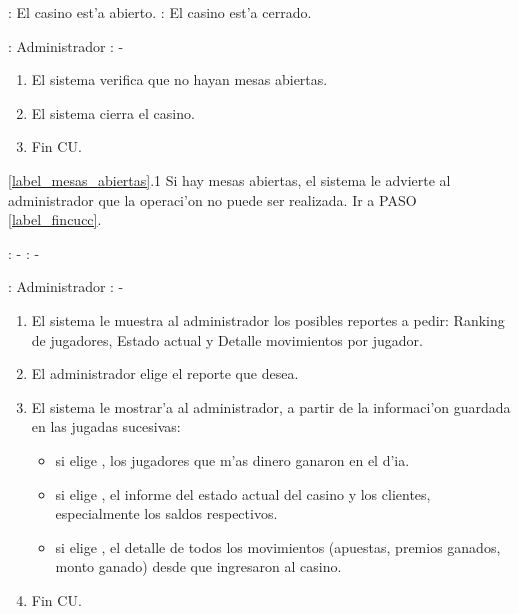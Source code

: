 : El casino est'a abierto. \newline
\indent{}: El casino est'a cerrado.

: Administrador \newline
\indent{}: -

\begin{enumerate}

\item El sistema verifica que no hayan mesas abiertas.
\item El sistema cierra el casino. \label{label_mesas_abiertas}
\item Fin CU. \label{label_fincucc}
\end{enumerate}


\ref{label_mesas_abiertas}.1 Si hay mesas abiertas, el sistema le advierte al administrador que la operaci'on no puede ser realizada. Ir a PASO \ref{label_fincucc}.




: - \newline
\indent{}: -

: Administrador \newline
\indent{}: -

\begin{enumerate}
\item El sistema le muestra al administrador los posibles reportes a pedir: Ranking de jugadores, Estado actual y Detalle movimientos por jugador.
\item El administrador elige el reporte que desea.
\item El sistema le mostrar'a al administrador, a partir de la informaci'on guardada en las jugadas sucesivas:
	\begin{itemize}
	\item si elige , los jugadores que m'as dinero ganaron en el d'ia.
	\item si elige , el informe del estado actual del casino y los clientes, especialmente los saldos respectivos.
	\item si elige , el detalle de todos los movimientos (apuestas, premios ganados, monto ganado) desde que ingresaron al casino.
	\end{itemize}
\item Fin CU.
\end{enumerate}




